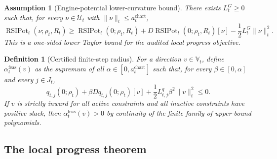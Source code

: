 \documentclass[11pt]{article}
\newtheorem{definition}[theorem]{Definition}
\newtheorem{assumption}[theorem]{Assumption}
\newcommand{\1}{\mathbf{1}}
\begin{document}
\begin{assumption}[Engine-potential lower-curvature bound]
\label{ass:engine_potential_lower_curvature_bound}
There exists \(L_t^{G}\ge0\) such that, for every \(\nu\in\mathcal U_t\) with \(\|\nu\|_t\le a_t^{\mathrm{chart}}\),
\[
\operatorname{RSIPot}_t(\nu;\rho_t,R_t)
\ge
\operatorname{RSIPot}_t(0;\rho_t,R_t)
+D\operatorname{RSIPot}_t(0;\rho_t,R_t)[\nu]
-\frac12 L_t^{G}\|\nu\|_t^2.
\]
This is a one-sided lower Taylor bound for the audited local progress objective.
\end{assumption}

\begin{definition}[Certified finite-step radius]
\label{def:certified_finite_step_radius}
For a direction \(v\in\mathbb V_t\), define \(\alpha_t^{\mathrm{feas}}(v)\) as the supremum of all \(\alpha\in[0,a_t^{\mathrm{chart}}]\) such that, for every \(\beta\in[0,\alpha]\) and every \(j\in J_t\),
\[
q_{t,j}(0;\rho_t)
+\beta Dq_{t,j}(0;\rho_t)[v]
+\frac12 L_{t,j}^{q}\beta^2\|v\|_t^2
\le0.
\]
If \(v\) is strictly inward for all active constraints and all inactive constraints have positive slack, then \(\alpha_t^{\mathrm{feas}}(v)>0\) by continuity of the finite family of upper-bound polynomials.
\end{definition}

\subsection{The local progress theorem}
\end{document}
